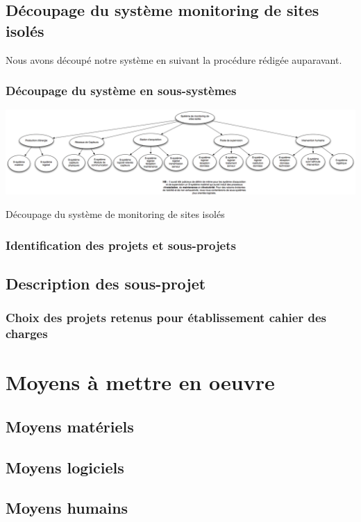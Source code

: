 \subsection{Découpage du système monitoring de sites isolés}
Nous avons découpé notre système en suivant la procédure rédigée auparavant.

\subsubsection{Découpage du système en sous-systèmes}

\begin {center}
\includegraphics[width=\textwidth]{png/graphDecompoSousSystemes.png}
\caption{Découpage du système de monitoring de sites isolés}
\end {center}

\subsubsection{Identification des projets et sous-projets}
\subsection{Description des sous-projet}
\subsubsection{Choix des projets retenus pour établissement cahier des charges}

\section{Moyens à mettre en oeuvre}
\subsection{Moyens matériels}
\subsection{Moyens logiciels}
\subsection{Moyens humains}
